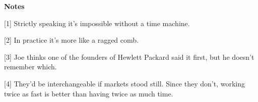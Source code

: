\textbf{Notes}

{[}1{]} Strictly speaking it's impossible without a time machine.

{[}2{]} In practice it's more like a ragged comb.

{[}3{]} Joe thinks one of the founders of Hewlett Packard said it first,
but he doesn't remember which.

{[}4{]} They'd be interchangeable if markets stood still. Since they
don't, working twice as fast is better than having twice as much time.
